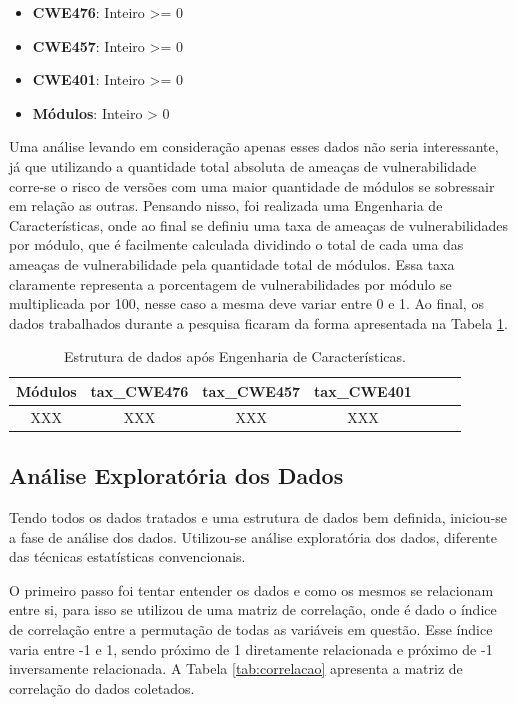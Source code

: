 \begin{itemize}
  \item \textbf{CWE476}: Inteiro >= 0
  \item \textbf{CWE457}: Inteiro >= 0
  \item \textbf{CWE401}: Inteiro >= 0
  \item \textbf{Módulos}: Inteiro > 0
\end{itemize}

Uma análise levando em consideração apenas esses dados não seria interessante,
já que utilizando a quantidade total absoluta de ameaças de vulnerabilidade
corre-se o risco de versões com uma maior quantidade de módulos se sobressair
em relação as outras. Pensando nisso, foi realizada uma Engenharia de
Características, onde ao final se definiu uma taxa de ameaças de
vulnerabilidades por módulo, que é facilmente calculada dividindo o total de
cada uma das ameaças de vulnerabilidade pela quantidade total de módulos. Essa
taxa claramente representa a porcentagem de vulnerabilidades por módulo se
multiplicada por 100, nesse caso a mesma deve variar entre 0 e 1. Ao final, os
dados trabalhados durante a pesquisa ficaram da forma apresentada na
Tabela \ref{tab:data_frame}.

\begin{table}[h]
\centering
\begin{tabular}{ccccccc}
\hline
\rowcolor[HTML]{EFEFEF} 
{Módulos} & {tax\_CWE476} & {tax\_CWE457} & {tax\_CWE401} \\ \hline
XXX           & XXX              & XXX              & XXX  \\
\hline
\end{tabular}
\caption{Estrutura de dados após Engenharia de Características.}
\label{tab:data_frame}
\end{table}


\subsection{Análise Exploratória dos Dados}\label{metodologia:eda}

Tendo todos os dados tratados e uma estrutura de dados bem definida, iniciou-se
a fase de análise dos dados. Utilizou-se análise exploratória dos dados,
diferente das técnicas estatísticas convencionais.

O primeiro passo foi tentar entender os dados e como os mesmos se relacionam
entre si, para isso se utilizou de uma matriz de correlação, onde é dado o
índice de correlação entre a permutação de todas as variáveis em questão. Esse
índice varia entre -1 e 1, sendo próximo de 1 diretamente relacionada e próximo de
-1 inversamente relacionada. A Tabela \ref{tab:correlacao} apresenta a matriz de
correlação do dados coletados.


